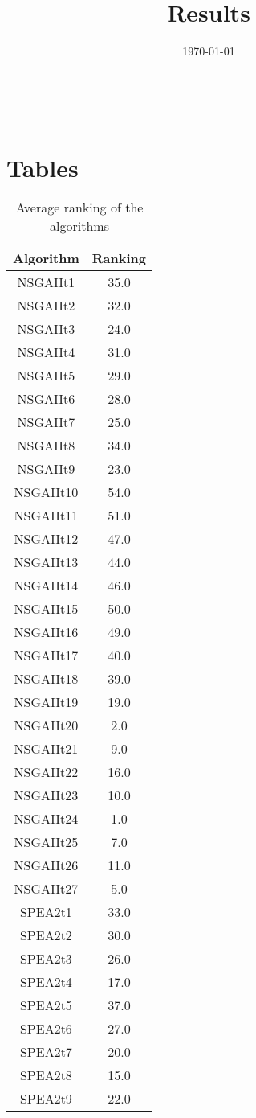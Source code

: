 \documentclass{article}
\title{Results}
\author{}
\date{\today}
\begin{document}
\oddsidemargin 0in \topmargin 0in\maketitle
\
\section{Tables}
\begin{table}[!htp]
\centering
\caption{Average ranking of the algorithms}
\begin{tabular}{c|c}
Algorithm&Ranking\\
\hline
NSGAIIt1&35.0\\
NSGAIIt2&32.0\\
NSGAIIt3&24.0\\
NSGAIIt4&31.0\\
NSGAIIt5&29.0\\
NSGAIIt6&28.0\\
NSGAIIt7&25.0\\
NSGAIIt8&34.0\\
NSGAIIt9&23.0\\
NSGAIIt10&54.0\\
NSGAIIt11&51.0\\
NSGAIIt12&47.0\\
NSGAIIt13&44.0\\
NSGAIIt14&46.0\\
NSGAIIt15&50.0\\
NSGAIIt16&49.0\\
NSGAIIt17&40.0\\
NSGAIIt18&39.0\\
NSGAIIt19&19.0\\
NSGAIIt20&2.0\\
NSGAIIt21&9.0\\
NSGAIIt22&16.0\\
NSGAIIt23&10.0\\
NSGAIIt24&1.0\\
NSGAIIt25&7.0\\
NSGAIIt26&11.0\\
NSGAIIt27&5.0\\
SPEA2t1&33.0\\
SPEA2t2&30.0\\
SPEA2t3&26.0\\
SPEA2t4&17.0\\
SPEA2t5&37.0\\
SPEA2t6&27.0\\
SPEA2t7&20.0\\
SPEA2t8&15.0\\
SPEA2t9&22.0\\

\end{tabular}
\end{table}
\end{document}
